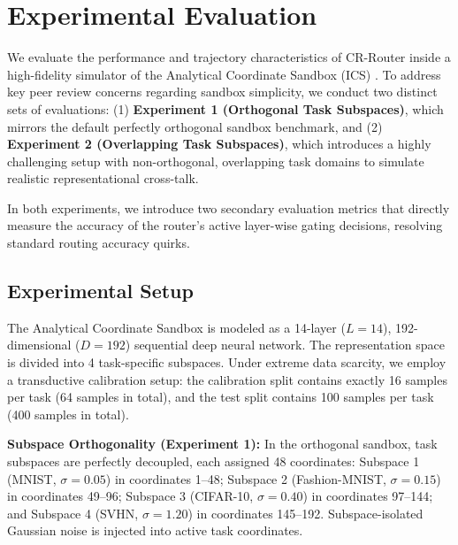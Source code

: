 \section{Experimental Evaluation}
\label{sec:experiments}

We evaluate the performance and trajectory characteristics of CR-Router inside a high-fidelity simulator of the Analytical Coordinate Sandbox (ICS) \cite{sable2025samplewise}. To address key peer review concerns regarding sandbox simplicity, we conduct two distinct sets of evaluations: (1) \textbf{Experiment 1 (Orthogonal Task Subspaces)}, which mirrors the default perfectly orthogonal sandbox benchmark, and (2) \textbf{Experiment 2 (Overlapping Task Subspaces)}, which introduces a highly challenging setup with non-orthogonal, overlapping task domains to simulate realistic representational cross-talk. 

In both experiments, we introduce two secondary evaluation metrics that directly measure the accuracy of the router's active layer-wise gating decisions, resolving standard routing accuracy quirks.

\subsection{Experimental Setup}
\label{subsec:setup}
The Analytical Coordinate Sandbox is modeled as a 14-layer ($L=14$), 192-dimensional ($D=192$) sequential deep neural network. The representation space is divided into 4 task-specific subspaces. Under extreme data scarcity, we employ a transductive calibration setup: the calibration split contains exactly 16 samples per task (64 samples in total), and the test split contains 100 samples per task (400 samples in total).

\textbf{Subspace Orthogonality (Experiment 1):} In the orthogonal sandbox, task subspaces are perfectly decoupled, each assigned 48 coordinates: Subspace 1 (MNIST, $\sigma = 0.05$) in coordinates 1--48; Subspace 2 (Fashion-MNIST, $\sigma = 0.15$) in coordinates 49--96; Subspace 3 (CIFAR-10, $\sigma = 0.40$) in coordinates 97--144; and Subspace 4 (SVHN, $\sigma = 1.20$) in coordinates 145--192. Subspace-isolated Gaussian noise is injected into active task coordinates.

